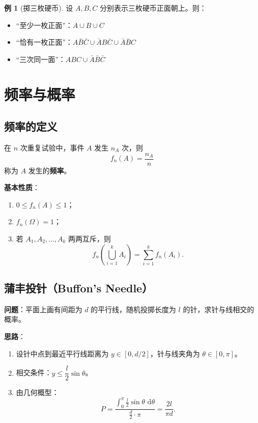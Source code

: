 \documentclass[11pt,a4paper]{report}
\theoremstyle{definition}
\newtheorem{example}{例}[chapter]
\newcommand{\diff}{\,\mathrm{d}}
\begin{document}
\begin{example}[掷三枚硬币]
设 $A,B,C$ 分别表示三枚硬币正面朝上。则：
\begin{itemize}[leftmargin=2em]
    \item ``至少一枚正面''：$A \cup B \cup C$
    \item ``恰有一枚正面''：$A\bar{B}\bar{C} \cup \bar{A}B\bar{C} \cup \bar{A}\bar{B}C$
    \item ``三次同一面''：$AB C \cup \bar{A}\bar{B}\bar{C}$
\end{itemize}
\end{example}

\section{频率与概率}

\subsection{频率的定义}
在 $n$ 次重复试验中，事件 $A$ 发生 $n_A$ 次，则
\[
f_n(A) = \frac{n_A}{n}
\]
称为 $A$ 发生的\textbf{频率}。

\textbf{基本性质}：
\begin{enumerate}[leftmargin=2em]
    \item $0 \leq f_n(A) \leq 1$；
    \item $f_n(\Omega) = 1$；
    \item 若 $A_1, A_2, \dots, A_k$ 两两互斥，则
    \[
    f_n\left(\bigcup_{i=1}^k A_i\right) = \sum_{i=1}^k f_n(A_i).
    \]
\end{enumerate}

\subsection{蒲丰投针（Buffon's Needle）}
\textbf{问题}：平面上画有间距为 $d$ 的平行线，随机投掷长度为 $l$ 的针，求针与线相交的概率。

\textbf{思路}：
\begin{enumerate}[leftmargin=2em]
    \item 设针中点到最近平行线距离为 $y \in [0, d/2]$，针与线夹角为 $\theta \in [0, \pi]$。
    \item 相交条件：$y \leq \dfrac{l}{2}\sin\theta$。
    \item 由几何概型：
    \[
    P = \frac{\int_0^\pi \frac{l}{2}\sin\theta \,\diff\theta}{\frac{d}{2} \cdot \pi} = \frac{2l}{\pi d}.
    \]
\end{enumerate}
\end{document}
